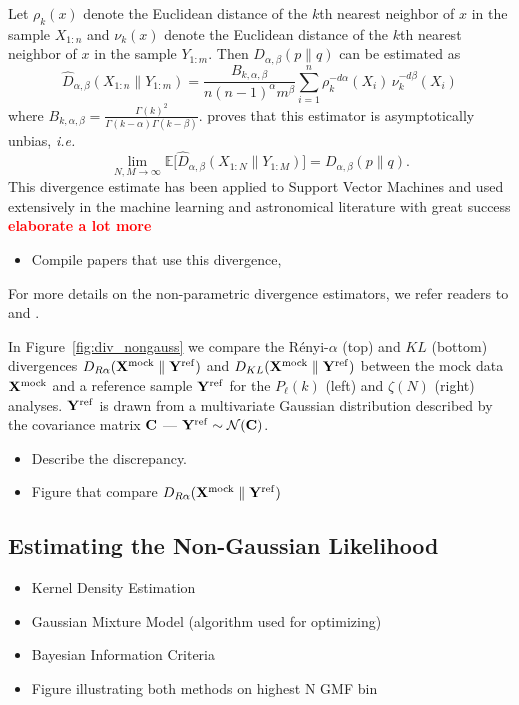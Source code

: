 \documentclass[12pt, letterpaper, preprint]{aastex}
\newcommand{\bitem}{\begin{itemize}}
\newcommand{\eitem}{\end{itemize}}
\newcommand{\beq}{\begin{equation}}
\newcommand{\eeq}{\end{equation}}
\newcommand{\todo}[1]{{\bf \textcolor{red}{#1}}}
\begin{document}
Let $\rho_k(x)$ denote the Euclidean distance of the $k$th nearest neighbor 
of $x$ in the sample $X_{1:n}$ and $\nu_k(x)$ denote the Euclidean distance 
of the $k$th nearest neighbor of $x$ in the sample $Y_{1:m}$. Then 
$D_{\alpha, \beta}(p \parallel q)$ can be estimated as 
\beq
\hat{D}_{\alpha, \beta}(X_{1:n} \parallel Y_{1:m}) = \frac{B_{k,\alpha,\beta}}{n (n-1)^\alpha m^\beta} \sum\limits_{i=1}^{n} \rho_k^{-d \alpha}(X_i)\,\nu_k^{-d \beta}(X_i)
\eeq
where $B_{k, \alpha, \beta} = \frac{\Gamma(k)^2}{\Gamma(k-\alpha)\Gamma(k-\beta)}$. 
\cite{poczos2012} proves that this estimator is asymptotically unbias, \emph{i.e.} 
\beq
\lim_{N, M \rightarrow \infty} \mathbb{E} \big[ \hat{D}_{\alpha, \beta} (X_{1:N} \parallel Y_{1:M}) \big] = D_{\alpha, \beta} (p \parallel q). 
\eeq
This divergence estimate has been applied to Support Vector Machines and used 
extensively in the machine learning and astronomical literature with great success 
\todo{elaborate a lot more} 
\bitem 
    \item Compile papers that use this divergence, \cite{ntampaka2015, ntampaka2016}
\eitem
For more details on the non-parametric divergence estimators, we refer readers to 
\cite{poczos2012} and \cite{krishnamurthy2014}.

In Figure~\ref{fig:div_nongauss} we compare the R\'enyi-$\alpha$ 
(top) and $KL$ (bottom) divergences
$D_{R\alpha}({\bf X}^\mathrm{mock} \parallel {\bf Y}^\mathrm{ref})$ and 
$D_{KL}({\bf X}^\mathrm{mock} \parallel {\bf Y}^\mathrm{ref})$
between the mock data ${\bf X}^\mathrm{mock}$ and a reference sample 
${\bf Y}^\mathrm{ref}$ for the $P_\ell(k)$ (left) and $\zeta(N)$ (right) analyses.
${\bf Y}^\mathrm{ref}$ is drawn from a multivariate Gaussian distribution 
described by the covariance matrix ${\bf C}$ --- 
${\bf Y}^\mathrm{ref} \sim \mathcal{N}({\bf C})$. 
\bitem 
    \item Describe the discrepancy. 
    \item Figure that compare $D_{R\alpha}({\bf X}^\mathrm{mock} \parallel {\bf Y}^\mathrm{ref})$
\eitem

\subsection{Estimating the Non-Gaussian Likelihood}
\bitem
    \item Kernel Density Estimation 
    \item Gaussian Mixture Model (algorithm used for optimizing) 
    \item Bayesian Information Criteria 
    \item Figure illustrating both methods on highest N GMF bin 
\eitem
\end{document}
